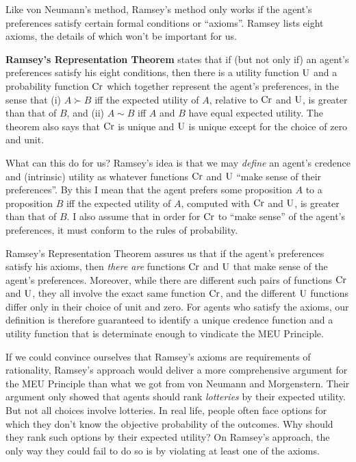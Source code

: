 Like von Neumann's method, Ramsey's method only works if the agent's preferences
satisfy certain formal conditions or ``axioms''. Ramsey lists eight axioms, the
details of which won't be important for us.

\textbf{Ramsey's Representation Theorem} states that if (but not only if) an
agent's preferences satisfy his eight conditions, then there is a utility
function $\text{U}$ and a probability function $\text{Cr}$ which together represent the
agent's preferences, in the sense that (i) $A \succ B$ iff the expected utility
of $A$, relative to $\text{Cr}$ and $\text{U}$, is greater than that of $B$, and (ii)
$A \sim B$ iff $A$ and $B$ have equal expected utility. The theorem also says
that $\text{Cr}$ is unique and $\text{U}$ is unique except for the choice of zero and unit.

What can this do for us? Ramsey's idea is that we may \emph{define} an agent's
credence and (intrinsic) utility as whatever functions $\text{Cr}$ and $\text{U}$ ``make
sense of their preferences''. By this I mean that the agent prefers some
proposition $A$ to a proposition $B$ iff the expected utility of $A$, computed
with $\text{Cr}$ and $\text{U}$, is greater than that of $B$. I also assume that in order
for $\text{Cr}$ to ``make sense'' of the agent's preferences, it must conform to the
rules of probability.

Ramsey's Representation Theorem assures us that if the agent's preferences
satisfy his axioms, then \emph{there are} functions $\text{Cr}$ and $\text{U}$ that make
sense of the agent's preferences. Moreover, while there are different such pairs
of functions $\text{Cr}$ and $\text{U}$, they all involve the exact same function $\text{Cr}$, and
the different $\text{U}$ functions differ only in their choice of unit and zero. For
agents who satisfy the axioms, our definition is therefore guaranteed to
identify a unique credence function and a utility function that is determinate
enough to vindicate the MEU Principle.

If we could convince ourselves that Ramsey's axioms are requirements of
rationality, Ramsey's approach would deliver a more comprehensive argument for
the MEU Principle than what we got from von Neumann and Morgenstern. Their
argument only showed that agents should rank \emph{lotteries} by their expected
utility. But not all choices involve lotteries. In real life, people often face
options for which they don't know the objective probability of the outcomes. Why
should they rank such options by their expected utility? On Ramsey's approach,
the only way they could fail to do so is by violating at least one of the
axioms.

